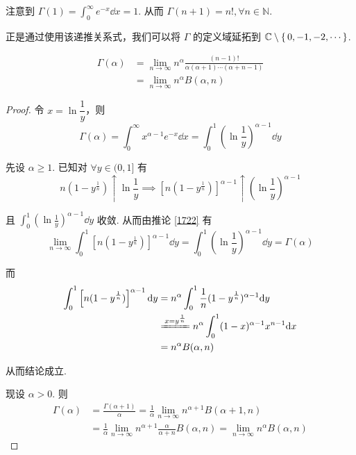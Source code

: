 注意到 $\Gamma(1)=\displaystyle\int_0^\infty e^{-x}\dd x=1$. 从而 $\Gamma(n+1)=n!,\forall n\in\mathbb{N}$.

\begin{hint}
    正是通过使用该递推关系式，我们可以将 $\Gamma$ 的定义域延拓到 $\mathbb{C}\setminus\set{0,-1,-2,\cdots}$.
\end{hint}


\begin{property}
$$
\begin{aligned}
    \Gamma(\alpha)&=\lim_{n\to\infty}n^\alpha\frac{(n-1)!}{\alpha(\alpha+1)\cdots(\alpha+n-1)}\\
    &=\lim_{n\to\infty}n^\alpha B(\alpha,n)
\end{aligned}
$$
\end{property}
\begin{proof}
    令 $x=\ln\dfrac{1}{y}$，则
$$
\Gamma(\alpha)=\int_0^\infty x^{\alpha-1}e^{-x}\dd x=\int_0^1\left(\ln\frac{1}{y}\right)^{\alpha-1}\dd y
$$

    先设 $\alpha\ge 1$. 已知对 $\forall y\in(0,1]$ 有
$$
n(1-y^\frac{1}{n})\uparrow\ln\frac{1}{y}\implies\left[n(1-y^\frac{1}{n})\right]^{\alpha-1}\uparrow\left(\ln\frac{1}{y}\right)^{\alpha-1}
$$

    且 $\displaystyle\int_0^1\left(\ln\frac{1}{y}\right)^{\alpha-1}\dd y$ 收敛. 从而由推论 \ref{1722} 有
$$
\lim_{n\to\infty}\int_0^1\left[n(1-y^\frac{1}{n})\right]^{\alpha-1}\dd y=\int_0^1\left(\ln\frac{1}{y}\right)^{\alpha-1}\dd y=\Gamma(\alpha)
$$

    而
$$
\begin{aligned}
    \int_0^1\left[n(1-y^\frac{1}{n})\right]^{\alpha-1}\dd y&=n^\alpha\int_0^1\frac{1}{n}(1-y^\frac{1}{n})^{\alpha-1}\dd y\\
    &\xlongequal{x=y^\frac{1}{n}}n^\alpha\int_0^1(1-x)^{\alpha-1}x^{n-1}\dd x\\
    &=n^\alpha B(\alpha,n)
\end{aligned}
$$

    从而结论成立.

    现设 $\alpha>0$. 则
$$
\begin{aligned}
    \Gamma(\alpha)&=\frac{\Gamma(\alpha+1)}{\alpha}=\frac{1}{\alpha}\lim_{n\to\infty}n^{\alpha+1}B(\alpha+1,n)\\
    &=\frac{1}{\alpha}\lim_{n\to\infty}n^{\alpha+1}\frac{\alpha}{\alpha+n}B(\alpha,n)=\lim_{n\to\infty}n^\alpha B(\alpha,n)
\end{aligned}
$$
\end{proof}

